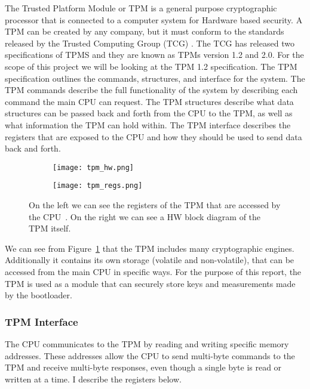 \documentclass[../report.tex]{subfiles}
\begin{document}
The Trusted Platform Module\cite{TPM} or TPM is a general purpose cryptographic processor that is connected to a computer system for Hardware based security.
A TPM can be created by any company, but it must conform to the standards released by the Trusted Computing Group (TCG) \cite{TCG}.
The TCG has released two specifications of TPMS and they are known as TPMs version 1.2 and 2.0.
For the scope of this project we will be looking at the TPM 1.2 specification.
The TPM specification outlines the commands, structures, and interface for the system.
The TPM commands describe the full functionality of the system by describing each command the main CPU can request.
The TPM structures describe what data structures can be passed back and forth from the CPU to the TPM, as well as what information the TPM can hold within.
The TPM interface describes the registers that are exposed to the CPU and how they should be used to send data back and forth.

\begin{figure}
  \centering
\begin{subfigure}{.4\textwidth}
  \centering
  \texttt{[image: tpm\_hw.png]}
\end{subfigure}
\begin{subfigure}{.40\textwidth}
  \centering
  \texttt{[image: tpm\_regs.png]}
\end{subfigure}
\caption{On the left we can see the registers of the TPM that are accessed by the CPU~. On the right we can see a HW block diagram of the TPM itself\cite{tpm-slides}.}
\label{fig:tpm_hw}
\end{figure}

We can see from Figure~\ref{fig:tpm_hw} that the TPM includes many cryptographic engines. 
Additionally it contains its own storage (volatile and non-volatile), that can be accessed from the main CPU in specific ways.
For the purpose of this report, the TPM is used as a module that can securely store keys and measurements made by the bootloader.

\subsubsection{TPM Interface}

The CPU communicates to the TPM by reading and writing specific memory addresses.
These addresses allow the CPU to send multi-byte commands to the TPM and receive multi-byte responses, even though a single byte is read or written at a time.
I describe the registers below.
\end{document}
